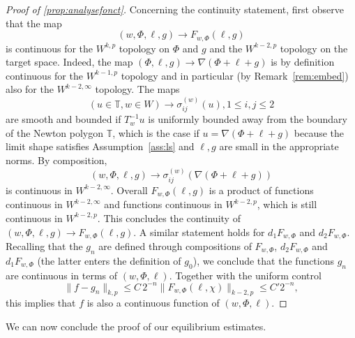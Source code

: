 \documentclass[10pt]{amsart}
\theoremstyle{definition}\newtheorem{defi}[theo]{Definition}\newtheorem{rema}[theo]{Remark}\newtheorem{exam}[theo]{Example}\newtheorem{exem}[theo]{Example}\newtheorem{nota}[theo]{Notation}
\newcommand{\bbT}{\mathbb{T}}
\newcommand{\norm}[1]{\lVert #1 \rVert}
\begin{document}
\begin{proof}[Proof of \cref{prop:analysefonct}]
Concerning the continuity statement, first observe that the map
\begin{equation}
(w,
\Phi, \ell, g) \to F_{w, \Phi}(\ell, g)
\end{equation}
is continuous for the $W^{k, p}$ topology on $\Phi$ and $g$ and the $W^{k-2, p} $ topology on the target space. Indeed, the map $(\Phi, \ell, g) \to \nabla (\Phi + \ell + g)$ is by definition continuous for the $W^{k-1, p}$ topology and in particular (by Remark~\ref{rem:embed}) also for the $W^{k-2, \infty}$ topology. The maps
\begin{equation}
(u\in \bbT, w\in W) \to \sigma_{ij}^{(w)}(u), 1\le i,j\le 2
\end{equation}
are smooth and bounded if $T_w^{-1}u$ is uniformly bounded away from the boundary of the Newton polygon $\bbT$, which is the case if $u=\nabla(\Phi+\ell+g)$ because the limit shape satisfies
Assumption~\ref{ass:ls} and $\ell,g$ are small in the appropriate norms. By composition,
\begin{equation}
(w, \Phi, \ell, g) \to \sigma_{ij}^{(w)}(\nabla (\Phi+\ell+g))
\end{equation}
is continuous in $W^{k-2, \infty}$. Overall $F_{w, \Phi}(\ell, g)$ is a product of functions continuous in $W^{k-2, \infty}$ and functions continuous in $W^{k-2, p}$, which is still continuous in $W^{k-2, p}$. This concludes the continuity of $(w,
\Phi, \ell, g) \to F_{w, \Phi}(\ell, g)$. A similar statement holds for $d_1 F_{w, \Phi}$ and $d_2 F_{w, \Phi}$. Recalling that the $g_n$ are defined through compositions of $F_{w,\Phi}$, $d_2F_{w,\Phi}$ and $d_1 F_{w,\Phi}$ (the latter enters the definition of $g_0$), we conclude that the functions $g_n$ are continuous in terms of $(w,
\Phi, \ell)$. Together with the uniform control
\begin{equation}
\norm{f - g_n }_{k,p}
\leq C\,2^{-n} \norm{F_{w,\Phi}(\ell, \chi)}_{k-2,p}\le C' 2^{-n},
\end{equation}
this implies that $f$ is also a continuous function of $(w, \Phi,
\ell)$.
\end{proof}



We can now conclude the proof of our equilibrium estimates.
\end{document}
